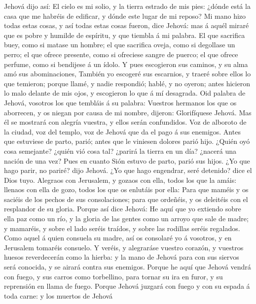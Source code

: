  Jehová dijo así: El cielo es mi solio, y la tierra estrado
de mis pies: ¿dónde está la casa que me habréis de edificar, y dónde
este lugar de mi reposo?  Mi mano hizo todas estas cosas, y
así todas estas cosas fueron, dice Jehová: mas á aquél miraré que es
pobre y humilde de espíritu, y que tiembla á mi palabra.  El
que sacrifica buey, como si matase un hombre; el que sacrifica oveja,
como si degollase un perro; el que ofrece presente, como si ofreciese
sangre de puerco; el que ofrece perfume, como si bendijese á un ídolo. Y
pues escogieron sus caminos, y su alma amó sus abominaciones,
 También yo escogeré sus escarnios, y traeré sobre ellos lo
que temieron; porque llamé, y nadie respondió; hablé, y no oyeron; antes
hicieron lo malo delante de mis ojos, y escogieron lo que á mí
desagrada.  Oid palabra de Jehová, vosotros los que tembláis
á su palabra: Vuestros hermanos los que os aborrecen, y os niegan por
causa de mi nombre, dijeron: Glorifíquese Jehová. Mas él se mostrará con
alegría vuestra, y ellos serán confundidos.  Voz de alboroto
de la ciudad, voz del templo, voz de Jehová que da el pago á sus
enemigos.  Antes que estuviese de parto, parió; antes que le
viniesen dolores parió hijo.  ¿Quién oyó cosa semejante?
¿quién vió cosa tal? ¿parirá la tierra en un día? ¿nacerá una nación de
una vez? Pues en cuanto Sión estuvo de parto, parió sus hijos.
 ¿Yo que hago parir, no pariré? dijo Jehová. ¿Yo que hago
engendrar, seré detenido? dice el Dios tuyo.  Alegraos con
Jerusalem, y gozaos con ella, todos los que la amáis: llenaos con ella
de gozo, todos los que os enlutáis por ella:  Para que
maméis y os saciéis de los pechos de sus consolaciones; para que
ordeñéis, y os deleitéis con el resplandor de su gloria. 
Porque así dice Jehová: He aquí que yo extiendo sobre ella paz como un
río, y la gloria de las gentes como un arroyo que sale de madre; y
mamaréis, y sobre el lado seréis traídos, y sobre las rodillas seréis
regalados.  Como aquel á quien consuela su madre, así os
consolaré yo á vosotros, y en Jerusalem tomaréis consuelo. 
Y veréis, y alegraráse vuestro corazón, y vuestros huesos reverdecerán
como la hierba: y la mano de Jehová para con sus siervos será conocida,
y se airará contra sus enemigos.  Porque he aquí que Jehová
vendrá con fuego, y sus carros como torbellino, para tornar su ira en
furor, y su reprensión en llama de fuego.  Porque Jehová
juzgará con fuego y con su espada á toda carne: y los muertos de Jehová
